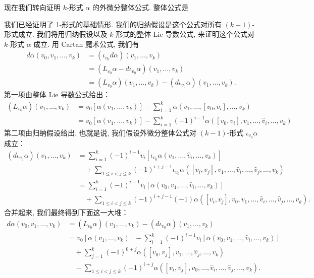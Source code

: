 现在我们转向证明 $k$-形式 $\alpha$ 的外微分整体公式. 整体公式是
\begin{center}
\end{center}
我们已经证明了 1-形式的基础情形. 我们的归纳假设是这个公式对所有 $(k-1)$-形式成立. 我们将用归纳假设以及 $k$-形式的整体 Lie 导数公式, 来证明这个公式对 $k$-形式 $\alpha$ 成立. 用 Cartan 魔术公式, 我们有
\begin{align*}
d\alpha(v_0,v_1,\ldots,v_k)&=\left(\iota_{v_0}d\alpha\right)(v_1,\ldots,v_k)\\
&=\left(L_{v_0}\alpha-d\iota_{v_0}\alpha\right)(v_1,\ldots,v_k)\\
&=\left(L_{v_0}\alpha\right)(v_1,\ldots,v_k)-\left(d\iota_{v_0}\alpha\right)(v_1,\ldots,v_k).
\end{align*}
第一项由整体 Lie 导数公式给出：
\begin{align*}
\left(L_{v_0}\alpha\right)(v_1,\ldots,v_k)
&=v_0\left[\alpha(v_1,\ldots,v_k)\right]-\sum_{i=1}^{k}\alpha\left(v_1,\ldots,[v_0,v_i],\ldots,v_k\right)\\
&=v_0\left[\alpha(v_1,\ldots,v_k)\right]-\sum_{i=1}^{k}(-1)^{i-1}\alpha\left([v_0,v_i],v_1,\ldots,\hat{v}_i,\ldots,v_k\right)
\end{align*}
第二项由归纳假设给出. 也就是说, 我们假设外微分整体公式对 $(k-1)$-形式 $\iota_{v_0}\alpha$ 成立：
\begin{align*}
\left(d\iota_{v_0}\alpha\right)(v_1,\ldots,v_k)
&=\sum_{i=1}^{k}(-1)^{i-1}v_i\left[\iota_{v_0}\alpha\left(v_1,\ldots,\hat{v}_i,\ldots,v_k\right)\right]\\
&\quad+\sum_{1\leq i<j\leq k}(-1)^{i+j-1}\iota_{v_0}\alpha\left([v_i,v_j],v_1,\ldots,\hat{v}_i,\ldots,\hat{v}_j,\ldots,v_k\right)\\
&=\sum_{i=1}^{k}(-1)^{i-1}v_i\left[\alpha\left(v_0,v_1,\ldots,\hat{v}_i,\ldots,v_k\right)\right]\\
&\quad+\sum_{1\leq i<j\leq k}(-1)^{i+j-1}(-1)\alpha\left([v_i,v_j],v_0,v_1,\ldots,\hat{v}_i,\ldots,\hat{v}_j,\ldots,v_k\right).
\end{align*}
合并起来, 我们最终得到下面这一大堆：
\begin{align*}
d\alpha(v_0,v_1,\ldots,v_k)&=\left(L_{v_0}\alpha\right)(v_1,\ldots,v_k)-\left(d\iota_{v_0}\alpha\right)(v_1,\ldots,v_k)\\
&=v_0\left[\alpha(v_1,\ldots,v_k)\right]-\sum_{i=1}^{k}(-1)^{i-1}v_i\left[\alpha\left(v_0,v_1,\ldots,\hat{v}_i,\ldots,v_k\right)\right]\\
&\quad+\sum_{j=1}^{k}(-1)^{0+j}\alpha\left([v_0,v_j],v_1,\ldots,\hat{v}_j,\ldots,v_k\right)\\
&\quad-\sum_{1\leq i<j\leq k}(-1)^{i+j}\alpha\left([v_i,v_j],v_0,\ldots,\hat{v}_i,\ldots,\hat{v}_j,\ldots,v_k\right).
\end{align*}
